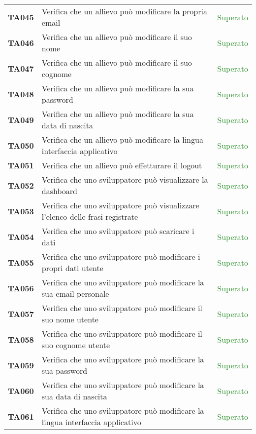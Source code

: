 \begin{tabularx}{\textwidth}{cXc}
	\textbf{TA045} & Verifica che un allievo può modificare la propria email & \textcolor{ForestGreen}{Superato} \\
	\textbf{TA046} & Verifica che un allievo può modificare il suo nome& \textcolor{ForestGreen}{Superato} \\
	\textbf{TA047} & Verifica che un allievo può modificare il suo cognome & \textcolor{ForestGreen}{Superato} \\
	\textbf{TA048} & Verifica che un allievo può modificare la sua password & \textcolor{ForestGreen}{Superato} \\
	\textbf{TA049} & Verifica che un allievo può modificare la sua data di nascita & \textcolor{ForestGreen}{Superato} \\
	\textbf{TA050} & Verifica che un allievo può modificare la lingua interfaccia applicativo & \textcolor{ForestGreen}{Superato} \\
	\textbf{TA051} & Verifica che un allievo può effetturare il logout & \textcolor{ForestGreen}{Superato} \\
    \textbf{TA052} & Verifica che uno sviluppatore può visualizzare la dashboard & \textcolor{ForestGreen}{Superato} \\
	\textbf{TA053} & Verifica che uno sviluppatore può visualizzare l'elenco delle frasi registrate  & \textcolor{ForestGreen}{Superato} \\
	\textbf{TA054} & Verifica che uno sviluppatore può scaricare i dati & \textcolor{ForestGreen}{Superato} \\
	\textbf{TA055} & Verifica che uno sviluppatore può modificare i propri dati utente & \textcolor{ForestGreen}{Superato} \\
	\textbf{TA056} & Verifica che uno sviluppatore può modificare la sua email personale & \textcolor{ForestGreen}{Superato} \\
	\textbf{TA057} & Verifica che uno sviluppatore può modificare il suo nome utente & \textcolor{ForestGreen}{Superato} \\
	\textbf{TA058} & Verifica che uno sviluppatore può modificare il suo cognome utente & \textcolor{ForestGreen}{Superato} \\
	\textbf{TA059} & Verifica che uno sviluppatore può modificare la sua password & \textcolor{ForestGreen}{Superato} \\
	\textbf{TA060} & Verifica che uno sviluppatore può modificare la sua data di nascita & \textcolor{ForestGreen}{Superato} \\
	\textbf{TA061} & Verifica che uno sviluppatore può modificare la lingua interfaccia applicativo & \textcolor{ForestGreen}{Superato} \\

\end{tabularx}
